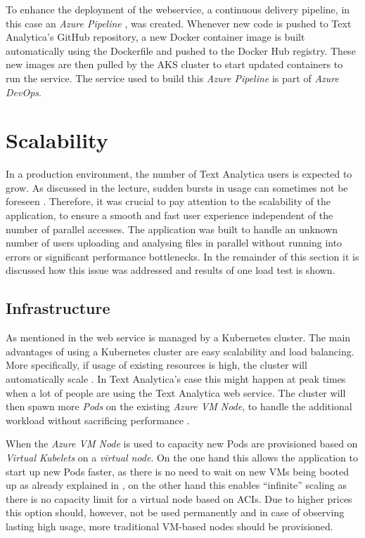 \documentclass[conference]{IEEEtran}
\begin{document}
To enhance the deployment of the webservice, a continuous delivery pipeline, in this case an \textit{Azure Pipeline} \cite{AzurePipeline}, was created. Whenever new code is pushed to Text Analytica's GitHub repository, a new Docker container image is built automatically using the Dockerfile and pushed to the Docker Hub registry. These new images are then pulled by the AKS cluster to start updated containers to run the service. The service used to build this \textit{Azure Pipeline} is part of \textit{Azure DevOps}.

\section{Scalability}
\label{sec:scalability}
In a production environment, the number of Text Analytica users is expected to grow. As discussed in the lecture, sudden bursts in usage can sometimes not be foreseen \cite{Animoto}. Therefore, it was crucial to pay attention to the scalability of the application, to ensure a smooth and fast user experience independent of the number of parallel accesses. The application was built to handle an unknown number of users uploading and analysing files in parallel without running into errors or significant performance bottlenecks. In the remainder of this section it is discussed how this issue was addressed and results of one load test is shown.

\subsection{Infrastructure}
As mentioned in  the web service is managed by a Kubernetes cluster. The main advantages of using a Kubernetes cluster are easy scalability and load balancing. More specifically, if usage of existing resources is high, the cluster will automatically scale \cite{KubernetesScaling, KubernetesAutoscaler}. In Text Analytica's case this might happen at peak times when a lot of people are using the Text Analytica web service. The cluster will then spawn more \textit{Pods} on the existing \textit{Azure VM Node}, to handle the additional workload without sacrificing performance \cite{MicrosoftAzureKubernetesService}.

When the \textit{Azure VM Node} is used to capacity new Pods are provisioned based on \textit{Virtual Kubelets} on a \textit{virtual node}. On the one hand this allows the application to start up new Pods faster, as there is no need to wait on new VMs being booted up as already explained in , on the other hand this enables “infinite” scaling as there is no capacity limit for a virtual node based on ACIs. Due to higher prices this option should, however, not be used permanently and in case of observing lasting high usage, more traditional VM-based nodes should be provisioned.
\end{document}
